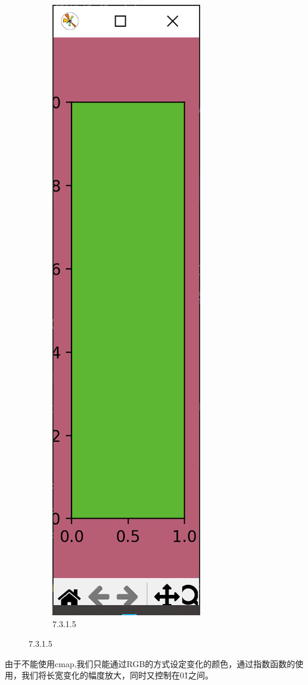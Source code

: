 \documentclass[12pt]{article}
\begin{document}
\begin{figure}[H]
\begin{subfigure}[b]{0.15\textwidth}
        \includegraphics[width=\textwidth]{React resize Pic2.png} %
        \caption{7.3.1.5}
        \label{fig:line-graph2-pic2}
    \end{subfigure}
\end{figure}
由于不能使用cmap,我们只能通过RGB的方式设定变化的颜色，通过指数函数的使用，我们将长宽变化的幅度放大，同时又控制在0\~1之间。
\end{document}
